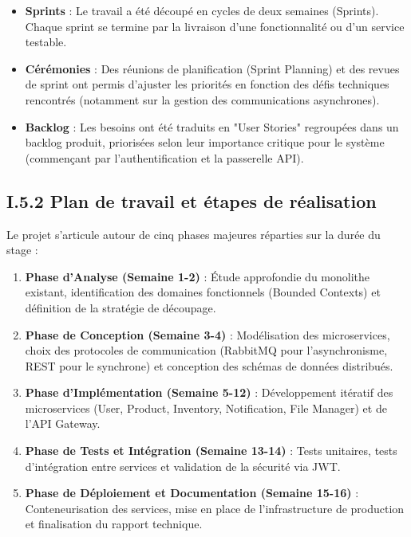 \begin{itemize}
    \item \textbf{Sprints} : Le travail a été découpé en cycles de deux semaines (Sprints). Chaque sprint se termine par la livraison d'une fonctionnalité ou d'un service testable.
    \item \textbf{Cérémonies} : Des réunions de planification (Sprint Planning) et des revues de sprint ont permis d'ajuster les priorités en fonction des défis techniques rencontrés (notamment sur la gestion des communications asynchrones).
    \item \textbf{Backlog} : Les besoins ont été traduits en "User Stories" regroupées dans un backlog produit, priorisées selon leur importance critique pour le système (commençant par l'authentification et la passerelle API).
\end{itemize}

\subsection{I.5.2 Plan de travail et étapes de réalisation}

Le projet s'articule autour de cinq phases majeures réparties sur la durée du stage :

\begin{enumerate}
    \item \textbf{Phase d'Analyse (Semaine 1-2)} : Étude approfondie du monolithe existant, identification des domaines fonctionnels (Bounded Contexts) et définition de la stratégie de découpage.
    \item \textbf{Phase de Conception (Semaine 3-4)} : Modélisation des microservices, choix des protocoles de communication (RabbitMQ pour l'asynchronisme, REST pour le synchrone) et conception des schémas de données distribués.
    \item \textbf{Phase d'Implémentation (Semaine 5-12)} : Développement itératif des microservices (User, Product, Inventory, Notification, File Manager) et de l'API Gateway.
    \item \textbf{Phase de Tests et Intégration (Semaine 13-14)} : Tests unitaires, tests d'intégration entre services et validation de la sécurité via JWT.
    \item \textbf{Phase de Déploiement et Documentation (Semaine 15-16)} : Conteneurisation des services, mise en place de l'infrastructure de production et finalisation du rapport technique.
\end{enumerate}

